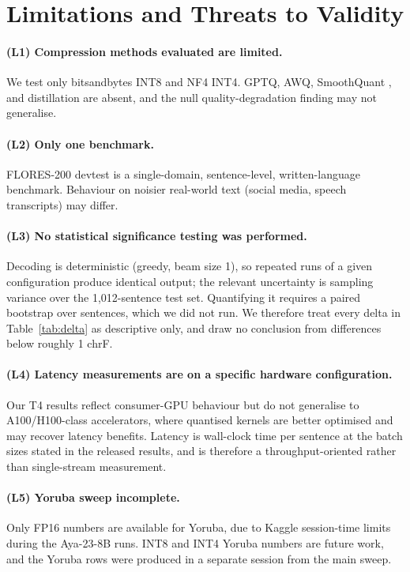 \documentclass[11pt,a4paper]{article}
\begin{document}
\section{Limitations and Threats to Validity}
\label{sec:limits}

\paragraph{(L1) Compression methods evaluated are limited.}
We test only bitsandbytes INT8 and NF4 INT4. GPTQ, AWQ, SmoothQuant
\cite{xiao2023smoothquant}, and distillation are absent, and the null
quality-degradation finding may not generalise.

\paragraph{(L2) Only one benchmark.}
FLORES-200 devtest is a single-domain, sentence-level, written-language
benchmark. Behaviour on noisier real-world text (social media, speech
transcripts) may differ.

\paragraph{(L3) No statistical significance testing was performed.}
Decoding is deterministic (greedy, beam size 1), so repeated runs of a
given configuration produce identical output; the relevant uncertainty
is sampling variance over the 1{,}012-sentence test set. Quantifying it
requires a paired bootstrap over sentences, which we did not run. We
therefore treat every delta in Table~\ref{tab:delta} as descriptive
only, and draw no conclusion from differences below roughly 1 chrF.

\paragraph{(L4) Latency measurements are on a specific hardware
configuration.}
Our T4 results reflect consumer-GPU behaviour but do not generalise to
A100/H100-class accelerators, where quantised kernels are better
optimised and may recover latency benefits. Latency is wall-clock time
per sentence at the batch sizes stated in the released results, and is
therefore a throughput-oriented rather than single-stream measurement.

\paragraph{(L5) Yoruba sweep incomplete.}
Only FP16 numbers are available for Yoruba, due to Kaggle session-time
limits during the Aya-23-8B runs. INT8 and INT4 Yoruba numbers are
future work, and the Yoruba rows were produced in a separate session
from the main sweep.
\end{document}
